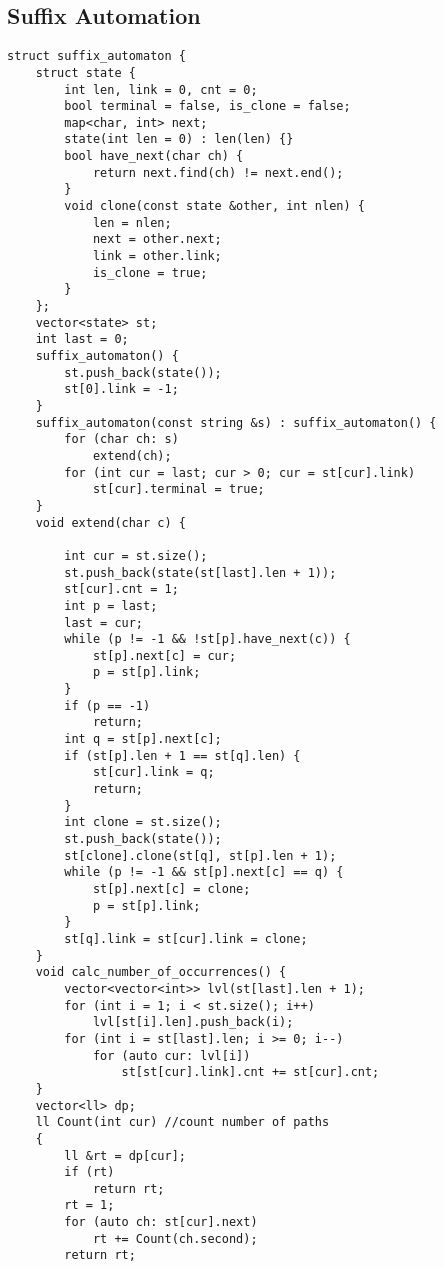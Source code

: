 \documentclass{article}
\begin{document}
{\subsection{Suffix Automation}
\begin{verbatim}
struct suffix_automaton {  
    struct state {  
        int len, link = 0, cnt = 0;  
        bool terminal = false, is_clone = false;  
        map<char, int> next;  
        state(int len = 0) : len(len) {}  
        bool have_next(char ch) {  
            return next.find(ch) != next.end();  
        }  
        void clone(const state &other, int nlen) {  
            len = nlen;  
            next = other.next;  
            link = other.link;  
            is_clone = true;  
        }  
    };  
    vector<state> st;  
    int last = 0;  
    suffix_automaton() {  
        st.push_back(state());  
        st[0].link = -1;  
    }  
    suffix_automaton(const string &s) : suffix_automaton() {  
        for (char ch: s)  
            extend(ch);  
        for (int cur = last; cur > 0; cur = st[cur].link)  
            st[cur].terminal = true;  
    }  
    void extend(char c) {  
          
        int cur = st.size();  
        st.push_back(state(st[last].len + 1));  
        st[cur].cnt = 1;  
        int p = last;  
        last = cur;  
        while (p != -1 && !st[p].have_next(c)) {  
            st[p].next[c] = cur;  
            p = st[p].link;  
        }  
        if (p == -1)  
            return;  
        int q = st[p].next[c];  
        if (st[p].len + 1 == st[q].len) {  
            st[cur].link = q;  
            return;  
        }  
        int clone = st.size();  
        st.push_back(state());  
        st[clone].clone(st[q], st[p].len + 1);  
        while (p != -1 && st[p].next[c] == q) {  
            st[p].next[c] = clone;  
            p = st[p].link;  
        }  
        st[q].link = st[cur].link = clone;  
    }  
    void calc_number_of_occurrences() {  
        vector<vector<int>> lvl(st[last].len + 1);  
        for (int i = 1; i < st.size(); i++)  
            lvl[st[i].len].push_back(i);  
        for (int i = st[last].len; i >= 0; i--)  
            for (auto cur: lvl[i])  
                st[st[cur].link].cnt += st[cur].cnt;  
    }  
    vector<ll> dp;  
    ll Count(int cur) //count number of paths  
    {  
        ll &rt = dp[cur];  
        if (rt)  
            return rt;  
        rt = 1;  
        for (auto ch: st[cur].next)  
            rt += Count(ch.second);  
        return rt;  
          

\end{verbatim}}
\end{document}
